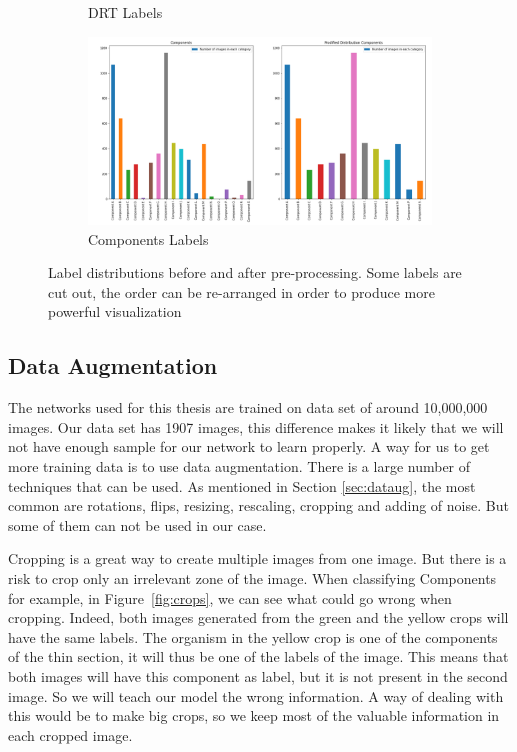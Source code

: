 \begin{figure}
\begin{subfigure}{.6\textwidth}
  \caption{DRT Labels}
  \label{fig:drtlab}
\end{subfigure}%
\begin{subfigure}{.6\textwidth}
  \centering
  \includegraphics[width=1\linewidth]{figures/03-Components.PNG}
  \caption{Components Labels}
  \label{fig:compolab}
\end{subfigure}
\caption[Pre processing of labels]{Label distributions before and after pre-processing. Some labels are cut out,  the order can be re-arranged in order to produce more powerful visualization}
\label{fig:labelsdistrib}
\end{figure}

\subsection{Data Augmentation}
The networks used for this thesis are trained on data set of around 10,000,000 images. Our data set has 1907 images, this difference makes it likely that we will not have enough sample for our network to learn properly. A way for us to get more training data is to use data augmentation.  There is a  large number of techniques that can be used. As mentioned in Section \ref{sec:dataug}, the most common are rotations, flips, resizing, rescaling, cropping and adding of noise. But some of them can not be used in our case. 

Cropping is a great way to create multiple images from one image. But there is a risk to crop only an irrelevant zone of the image. When classifying Components for example, in Figure~\ref{fig:crops}, we can see what could go wrong when cropping. Indeed, both images generated from the green and the yellow crops will have the same labels. The organism in the yellow crop is one of the components of the thin section, it will thus be one of the labels of the image. This means that both images will have this component as label, but it is not present in the second image. So we will teach our model the wrong information. A way of dealing with this would be to make big crops, so we keep most of the valuable information in each cropped image.  

